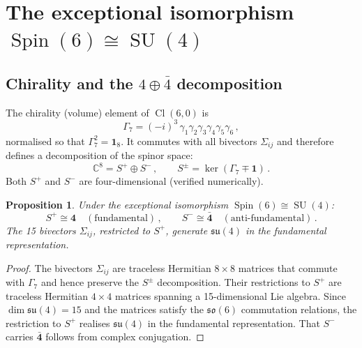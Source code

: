 \documentclass[12pt,a4paper]{article}
\newtheorem{proposition}[theorem]{Proposition}
\theoremstyle{definition}
\newcommand{\SU}{\operatorname{SU}}
\newcommand{\Spin}{\operatorname{Spin}}
\newcommand{\Cl}{\operatorname{Cl}}
\newcommand{\C}{\mathbb{C}}
\begin{document}
\section{The exceptional isomorphism \texorpdfstring{$\Spin(6) \cong \SU(4)$}{Spin(6) = SU(4)}}
\label{sec:isomorphism}

\subsection{Chirality and the \texorpdfstring{$4 \oplus \bar{4}$}{4+4bar} decomposition}

The chirality (volume) element of $\Cl(6,0)$ is
\begin{equation}
\Gamma_7 = (-i)^3\, \gamma_1 \gamma_2 \gamma_3 \gamma_4 \gamma_5 \gamma_6\,,
\end{equation}
normalised so that $\Gamma_7^2 = \mathbf{1}_8$.
It commutes with all bivectors $\Sigma_{ij}$ and therefore defines a decomposition of the spinor space:
\begin{equation}
\C^8 = S^+ \oplus S^-\,, \qquad S^\pm = \ker(\Gamma_7 \mp \mathbf{1})\,.
\end{equation}
Both $S^+$ and $S^-$ are four-dimensional (verified numerically).

\begin{proposition}
Under the exceptional isomorphism $\Spin(6) \cong \SU(4)$:
\begin{equation}
S^+ \cong \mathbf{4} \quad (\text{fundamental})\,, \qquad S^- \cong \bar{\mathbf{4}} \quad (\text{anti-fundamental})\,.
\end{equation}
The 15 bivectors $\Sigma_{ij}$, restricted to $S^+$, generate $\mathfrak{su}(4)$ in the fundamental representation.
\end{proposition}

\begin{proof}
The bivectors $\Sigma_{ij}$ are traceless Hermitian $8 \times 8$ matrices that commute with $\Gamma_7$ and hence preserve the $S^\pm$ decomposition.
Their restrictions to $S^+$ are traceless Hermitian $4 \times 4$ matrices spanning a 15-dimensional Lie algebra.
Since $\dim \mathfrak{su}(4) = 15$ and the matrices satisfy the $\mathfrak{so}(6)$ commutation relations, the restriction to $S^+$ realises $\mathfrak{su}(4)$ in the fundamental representation.
That $S^-$ carries $\bar{\mathbf{4}}$ follows from complex conjugation.
\end{proof}
\end{document}
